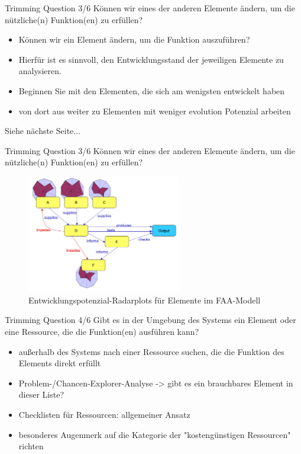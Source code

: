 \documentclass{beamer}
\begin{document}
	
	\begin{frame}{Trimming Question 3/6}
		Können wir eines der anderen Elemente ändern, um die nützliche(n) Funktion(en) zu erfüllen?
		\begin{itemize}
			\item Können wir ein Element ändern, um die Funktion auszuführen?
			\item Hierfür ist es sinnvoll, den Entwicklungsstand der jeweiligen Elemente zu analysieren.
			\item Beginnen Sie mit den Elementen, die sich am wenigsten entwickelt haben
			\item von dort aus weiter zu Elementen mit weniger evolution Potenzial arbeiten
		\end{itemize}
		
		Siehe nächste Seite...
	\end{frame}
	
	\begin{frame}{Trimming Question 3/6}
	Können wir eines der anderen Elemente ändern, um die nützliche(n) Funktion(en) zu erfüllen?
		\begin{figure}
			\centering
			\includegraphics[width=0.6\textwidth]{img/q3.jpg}
			\caption{Entwicklungspotenzial-Radarplots für Elemente im FAA-Modell}
		\end{figure}
	\end{frame}
	
	\begin{frame}{Trimming Question 4/6}
		Gibt es in der Umgebung des Systems ein Element oder eine Ressource, die die Funktion(en) ausführen kann?
		\begin{itemize}
			\item außerhalb des Systems nach einer Ressource suchen, die die Funktion des Elements direkt erfüllt
			\item Problem-/Chancen-Explorer-Analyse -> gibt es ein brauchbares Element in dieser Liste? 
			\item Checklisten für Ressourcen: allgemeiner Ansatz
			\item besonderes Augenmerk auf die Kategorie der "kostengünstigen Ressourcen" richten
		\end{itemize}
	\end{frame}
	
\end{document}
